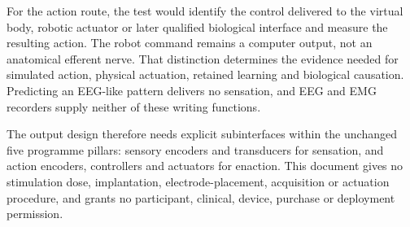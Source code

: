 For the action route, the test would identify the control delivered to the virtual body, robotic actuator or later qualified biological interface and measure the resulting action. The robot command remains a computer output, not an anatomical efferent nerve. That distinction determines the evidence needed for simulated action, physical actuation, retained learning and biological causation. Predicting an EEG-like pattern delivers no sensation, and EEG and EMG recorders supply neither of these writing functions.

The output design therefore needs explicit subinterfaces within the unchanged five programme pillars: sensory encoders and transducers for sensation, and action encoders, controllers and actuators for enaction. This document gives no stimulation dose, implantation, electrode-placement, acquisition or actuation procedure, and grants no participant, clinical, device, purchase or deployment permission.

